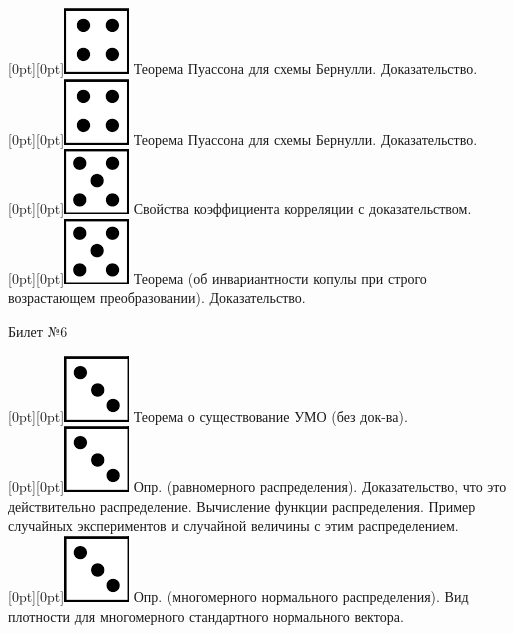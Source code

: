 \documentclass[10pt]{article}
\begin{document}
\raisebox{-1pt}[0pt][0pt]{\includegraphics[width=0.02\linewidth]{4.png}} Теорема Пуассона для схемы Бернулли. Доказательство. \\

\raisebox{-1pt}[0pt][0pt]{\includegraphics[width=0.02\linewidth]{4.png}} Теорема Пуассона для схемы Бернулли. Доказательство. \\

\raisebox{-1pt}[0pt][0pt]{\includegraphics[width=0.02\linewidth]{5.png}} Свойства коэффициента корреляции с доказательством. \\

\raisebox{-1pt}[0pt][0pt]{\includegraphics[width=0.02\linewidth]{5.png}} Теорема (об инвариантности копулы при строго возрастающем преобразовании). Доказательство. \\

\begin{center} {\Large Билет №6} \end{center} 

\raisebox{-1pt}[0pt][0pt]{\includegraphics[width=0.02\linewidth]{3.png}} Теорема о существование УМО (без док-ва). \\

\raisebox{-1pt}[0pt][0pt]{\includegraphics[width=0.02\linewidth]{3.png}}  Опр. (равномерного распределения). Доказательство, что это действительно распределение. Вычисление функции распределения. Пример случайных экспериментов и случайной величины с этим распределением. \\

\raisebox{-1pt}[0pt][0pt]{\includegraphics[width=0.02\linewidth]{3.png}} Опр. (многомерного нормального распределения). Вид плотности для многомерного стандартного нормального вектора. \\ 
\end{document}
